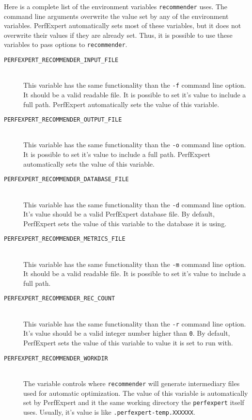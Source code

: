 Here is a complete list of the environment variables \texttt{recommender} uses. The command line arguments overwrite the value set by any of the environment variables. PerfExpert automatically sets most of these variables, but it does not overwrite their values if they are already set. Thus, it is possible to use these variables to pass options to \texttt{recommender}.

\begin{description}
	\item[\texttt{PERFEXPERT\_RECOMMENDER\_INPUT\_FILE}]\hfill \\
	This variable has the same functionality than the \texttt{-f} command line option. It should be a valid readable file. It is possible to set it's value to include a full path. PerfExpert automatically sets the value of this variable.
	
	\item[\texttt{PERFEXPERT\_RECOMMENDER\_OUTPUT\_FILE}]\hfill \\
	This variable has the same functionality than the \texttt{-o} command line option.  It is possible to set it's value to include a full path. PerfExpert automatically sets the value of this variable.

	\item[\texttt{PERFEXPERT\_RECOMMENDER\_DATABASE\_FILE}]\hfill \\
	This variable has the same functionality than the \texttt{-d} command line option. It's value should be a valid PerfExpert database file. By default, PerfExpert sets the value of this variable to the database it is using.

	\item[\texttt{PERFEXPERT\_RECOMMENDER\_METRICS\_FILE}]\hfill \\
	This variable has the same functionality than the \texttt{-m} command line option. It should be a valid readable file. It is possible to set it's value to include a full path.
	
	\item[\texttt{PERFEXPERT\_RECOMMENDER\_REC\_COUNT}]\hfill \\
	This variable has the same functionality than the \texttt{-r} command line option. It's value should be a valid integer number higher than \texttt{0}. By default, PerfExpert sets the value of this variable to value it is set to run with.

	\item[\texttt{PERFEXPERT\_RECOMMENDER\_WORKDIR}]\hfill \\
	The variable controls where \texttt{recommender} will generate intermediary files used for automatic optimization. The value of this variable is automatically set by PerfExpert and it the same working directory the \texttt{perfexpert} itself uses. Usually, it's value is like \texttt{.perfexpert-temp.XXXXXX}.


\end{description}
